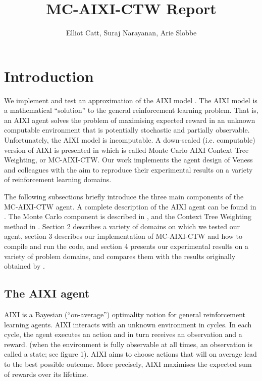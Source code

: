 \documentclass{article}
\title{MC-AIXI-CTW Report}
\author{Elliot Catt, Suraj Narayanan, Arie Slobbe}
\theoremstyle{definition}
\newtheorem{primary statistics}[definition]{Primary Statistics}
\newtheorem{auxiliary statistics}[definition]{Auxiliary Statistics}
\begin{document}
\maketitle
\tableofcontents

\newpage

\section{Introduction}
We implement and test an approximation of the AIXI model \citep{hutter2005universal}. The AIXI model is a mathematical “solution” to the general reinforcement learning problem. That is, an AIXI agent solves the problem of maximising expected reward in an unknown computable environment that is potentially stochastic and partially observable. Unfortunately, the AIXI model is incomputable. A down-scaled (i.e. computable) version of AIXI is presented in \citep{veness2011monte} which is called Monte Carlo AIXI Context Tree Weighting, or MC-AIXI-CTW. Our work implements the agent design of Veness and colleagues with the aim to reproduce their experimental results on a variety of reinforcement learning domains.

The following subsections briefly introduce the three main components of the MC-AIXI-CTW agent. A complete description of the AIXI agent can be found in \citep{hutter2005universal}. The Monte Carlo component is described in \citep{kocsis2006bandit}, and the Context Tree Weighting method in \citep{willems1995context}.  Section 2 describes a variety of domains on which we tested our agent, section 3 describes our implementation of MC-AIXI-CTW and how to compile and run the code, and section 4 presents our experimental results on a variety of problem domains, and compares them with the results originally obtained by \citep{veness2011monte}.

\subsection{The AIXI agent}
AIXI is a Bayesian (``on-average'') optimality notion for general reinforcement learning agents. AIXI interacts with an unknown environment in cycles. In each cycle, the agent executes an action and in turn receives an observation and a reward. (when the environment is fully observable at all times, an observation is called a state; see figure 1). AIXI aims to choose actions that will on average lead to the best possible outcome. More precisely, AIXI maximises the expected sum of rewards over its lifetime.
\end{document}
